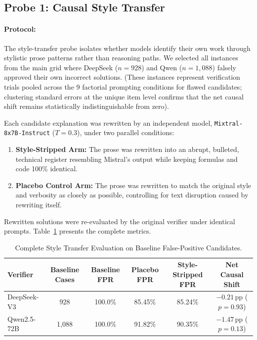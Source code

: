 \subsection{Probe 1: Causal Style Transfer}
\paragraph{Protocol:}
The style-transfer probe isolates whether models identify their own work through stylistic prose patterns rather than reasoning paths. We selected all instances from the main grid where DeepSeek ($n = 928$) and Qwen ($n = 1{,}088$) falsely approved their own incorrect solutions. (These instances represent verification trials pooled across the 9 factorial prompting conditions for flawed candidates; clustering standard errors at the unique item level confirms that the net causal shift remains statistically indistinguishable from zero).

Each candidate explanation was rewritten by an independent model, \texttt{Mixtral-8x7B-Instruct} ($T=0.3$), under two parallel conditions:
\begin{enumerate}[nosep, leftmargin=*]
  \item \textbf{Style-Stripped Arm:} The prose was rewritten into an abrupt, bulleted, technical register resembling Mistral's output while keeping formulas and code 100\% identical.
  \item \textbf{Placebo Control Arm:} The prose was rewritten to match the original style and verbosity as closely as possible, controlling for text disruption caused by rewriting itself.
\end{enumerate}
Rewritten solutions were re-evaluated by the original verifier under identical prompts. Table~\ref{tab:style-full} presents the complete metrics.

\begin{table}[H]
\centering
\small
\caption{Complete Style Transfer Evaluation on Baseline False-Positive Candidates.}
\label{tab:style-full}
\begin{tabular}{lccccc}
\toprule
\bf Verifier & \bf Baseline Cases & \bf Baseline FPR & \bf Placebo FPR & \bf Style-Stripped FPR & \bf Net Causal Shift \\
\midrule
DeepSeek-V3 & 928   & 100.0\% & 85.45\% & 85.24\% & $-0.21$\,pp ($p = 0.93$) \\
Qwen2.5-72B & 1,088 & 100.0\% & 91.82\% & 90.35\% & $-1.47$\,pp ($p = 0.13$) \\
\bottomrule
\end{tabular}
\end{table}

